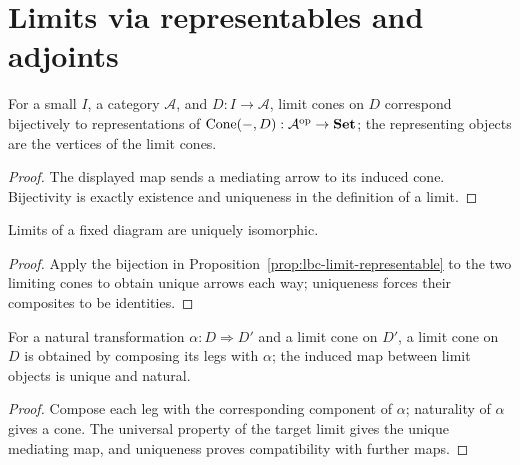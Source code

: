 \section{Limits via representables and adjoints}
\begin{proposition}
\label{prop:lbc-limit-representable}
For a small $I$, a category $\mathcal A$, and $D:I\to\mathcal A$, limit cones
on $D$ correspond bijectively to representations of
$\operatorname{Cone}(-,D):\mathcal A^{\mathrm{op}}\to\mathbf{Set}$; the representing objects are
the vertices of the limit cones.
\end{proposition}
\begin{proof}
The displayed map sends a mediating arrow to its induced cone. Bijectivity is
exactly existence and uniqueness in the definition of a limit.
\end{proof}

\begin{corollary}
\label{cor:lbc-limit-unique}
Limits of a fixed diagram are uniquely isomorphic.
\end{corollary}
\begin{proof}
Apply the bijection in Proposition~\ref{prop:lbc-limit-representable} to the
two limiting cones to obtain unique arrows each way; uniqueness forces their
composites to be identities.
\end{proof}

\begin{lemma}
\label{lem:lbc-natural-cone-map}
For a natural transformation $\alpha:D\Rightarrow D'$ and a limit cone on $D'$, a
limit cone on $D$ is obtained by composing its legs with $\alpha$; the induced
map between limit objects is unique and natural.
\end{lemma}
\begin{proof}
Compose each leg with the corresponding component of $\alpha$; naturality of
$\alpha$ gives a cone. The universal property of the target limit gives the
unique mediating map, and uniqueness proves compatibility with further maps.
\end{proof}

